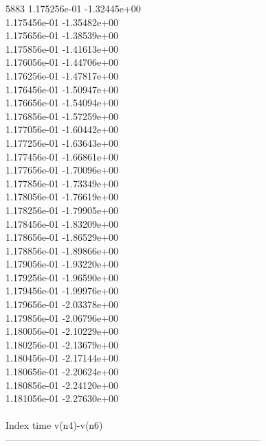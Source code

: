 5883	1.175256e-01	-1.32445e+00	\\ 	1.175456e-01	-1.35482e+00	\\ 	1.175656e-01	-1.38539e+00	\\ 	1.175856e-01	-1.41613e+00	\\ 	1.176056e-01	-1.44706e+00	\\ 	1.176256e-01	-1.47817e+00	\\ 	1.176456e-01	-1.50947e+00	\\ 	1.176656e-01	-1.54094e+00	\\ 	1.176856e-01	-1.57259e+00	\\ 	1.177056e-01	-1.60442e+00	\\ 	1.177256e-01	-1.63643e+00	\\ 	1.177456e-01	-1.66861e+00	\\ 	1.177656e-01	-1.70096e+00	\\ 	1.177856e-01	-1.73349e+00	\\ 	1.178056e-01	-1.76619e+00	\\ 	1.178256e-01	-1.79905e+00	\\ 	1.178456e-01	-1.83209e+00	\\ 	1.178656e-01	-1.86529e+00	\\ 	1.178856e-01	-1.89866e+00	\\ 	1.179056e-01	-1.93220e+00	\\ 	1.179256e-01	-1.96590e+00	\\ 	1.179456e-01	-1.99976e+00	\\ 	1.179656e-01	-2.03378e+00	\\ 	1.179856e-01	-2.06796e+00	\\ 	1.180056e-01	-2.10229e+00	\\ 	1.180256e-01	-2.13679e+00	\\ 	1.180456e-01	-2.17144e+00	\\ 	1.180656e-01	-2.20624e+00	\\ 	1.180856e-01	-2.24120e+00	\\ 	1.181056e-01	-2.27630e+00	\\ \hline
\\ \hline
Index   time            v(n4)-v(n6)     \\ \hline
--------------------------------------------------------------------------------\\ \hline

